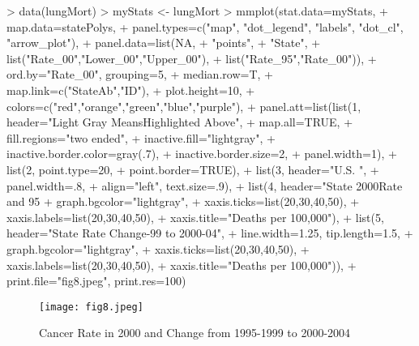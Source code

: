 \documentclass{article}
\begin{document}
\begin{Schunk}
\begin{Sinput}
> data(lungMort)
> myStats <- lungMort
> mmplot(stat.data=myStats,
+ map.data=statePolys,
+ panel.types=c("map", "dot_legend", "labels", "dot_cl", "arrow_plot"),
+ panel.data=list(NA,
+ "points",
+ "State",
+ list("Rate_00","Lower_00","Upper_00"),
+ list("Rate_95","Rate_00")),
+ ord.by="Rate_00", grouping=5,
+ median.row=T,
+ map.link=c("StateAb","ID"),
+ plot.height=10,
+ colors=c("red","orange","green","blue","purple"),
+ panel.att=list(list(1, header="Light Gray Means\n Highlighted Above",
+ map.all=TRUE,
+ fill.regions="two ended",
+ inactive.fill="lightgray",                    
+ inactive.border.color=gray(.7),
+ inactive.border.size=2,
+ panel.width=1),
+ list(2, point.type=20,
+ point.border=TRUE),
+ list(3, header="U.S. \nStates ",
+ panel.width=.8,
+ align="left", text.size=.9),
+ list(4, header="State 2000\n Rate and 95% CI",
+ graph.bgcolor="lightgray",
+ xaxis.ticks=list(20,30,40,50),
+ xaxis.labels=list(20,30,40,50),
+ xaxis.title="Deaths per 100,000"),
+ list(5, header="State Rate Change-99 to 2000-04",
+ line.width=1.25, tip.length=1.5,
+ graph.bgcolor="lightgray",
+ xaxis.ticks=list(20,30,40,50),
+ xaxis.labels=list(20,30,40,50),
+ xaxis.title="Deaths per 100,000")),
+ print.file="fig8.jpeg", print.res=100) 
\end{Sinput}
\end{Schunk}

\begin{figure}
\begin{center}
\texttt{[image: fig8.jpeg]} 
  \caption{Cancer Rate in 2000 and Change from 1995-1999 to 2000-2004} 
  \label{fig8}
\end{center}
\end{figure}
\end{document}
